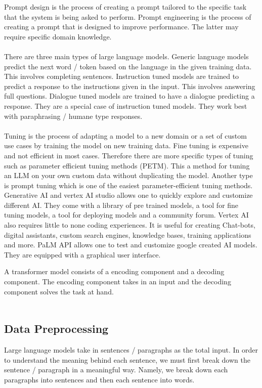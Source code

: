 \documentclass[a4paper]{article}
\begin{document}
\begin{enumerate}
Prompt design is the process of creating a prompt tailored to the specific task that the system is being asked to perform. Prompt engineering is the process of creating a prompt that is designed to improve performance. The latter may require specific domain knowledge. \\~\\

There are three main types of large language models. Generic language models predict the next word / token based on the language in the given training data. This involves completing sentences. Instruction tuned models are trained to predict a response to the instructions given in the input. This involves answering full questions. Dialogue tuned models are trained to have a dialogue predicting a response. They are a special case of instruction tuned models. They work best with paraphrasing / humane type responses. \\~\\

Tuning is the process of adapting a model to a new domain or a set of custom use cases by training the model on new training data. Fine tuning is expensive and not efficient in most cases. Therefore there are more specific types of tuning such as parameter efficient tuning methods (PETM). This a method for tuning an LLM on your own custom data without duplicating the model. Another type is prompt tuning which is one of the easiest parameter-efficient tuning methods. Generative AI and vertex AI studio allows one to quickly explore and customize different AI. They come with a library of pre trained models, a tool for fine tuning models, a tool for deploying models and a community forum. Vertex AI also requires little to none coding experiences. It is useful for creating Chat-bots, digital assistants, custom search engines, knowledge bases, training applications and more. PaLM API allows one to test and customize google created AI models. They are equipped with a graphical user interface. 

A transformer model consists of a encoding component and a decoding component. The encoding component takes in an input and the decoding component solves the task at hand. \\~\\


\subsection{Data Preprocessing}
Large language models take in sentences / paragraphs as the total input. In order to understand the meaning behind each sentence, we must first break down the sentence / paragraph in a meaningful way. Namely, we break down each paragraphs into sentences and then each sentence into words. \\~\\


\end{enumerate}
\end{document}
